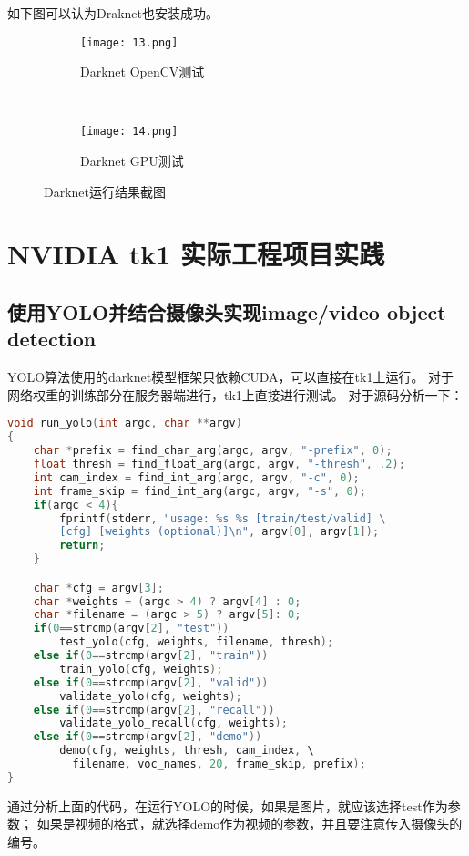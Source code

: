 \documentclass[openany]{ctexbook}
\begin{document}
如下图可以认为Draknet也安装成功。

\begin{figure*}[h]
    \centering
        \begin{subfigure}[h!]{0.5\textwidth}
            \centering
            \texttt{[image: 13.png]}
            \caption{Darknet OpenCV测试}
        \end{subfigure}%
        ~
        \begin{subfigure}[h!]{0.5\textwidth}
            \centering
            \texttt{[image: 14.png]}
            \caption{Darknet GPU测试}
        \end{subfigure}
        \caption{Darknet运行结果截图}
\end{figure*}

\chapter{NVIDIA tk1 实际工程项目实践}
\section{使用YOLO并结合摄像头实现image/video object detection}
YOLO算法使用的darknet模型框架只依赖CUDA，可以直接在tk1上运行。
对于网络权重的训练部分在服务器端进行，tk1上直接进行测试。
对于源码分析一下：
{\setmainfont{Courier New Bold}                          %
\begin{lstlisting}[language=c]
void run_yolo(int argc, char **argv)
{
    char *prefix = find_char_arg(argc, argv, "-prefix", 0);
    float thresh = find_float_arg(argc, argv, "-thresh", .2);
    int cam_index = find_int_arg(argc, argv, "-c", 0);
    int frame_skip = find_int_arg(argc, argv, "-s", 0);
    if(argc < 4){
        fprintf(stderr, "usage: %s %s [train/test/valid] \
        [cfg] [weights (optional)]\n", argv[0], argv[1]);
        return;
    }

    char *cfg = argv[3];
    char *weights = (argc > 4) ? argv[4] : 0;
    char *filename = (argc > 5) ? argv[5]: 0;
    if(0==strcmp(argv[2], "test"))
        test_yolo(cfg, weights, filename, thresh);
    else if(0==strcmp(argv[2], "train"))
        train_yolo(cfg, weights);
    else if(0==strcmp(argv[2], "valid"))
        validate_yolo(cfg, weights);
    else if(0==strcmp(argv[2], "recall"))
        validate_yolo_recall(cfg, weights);
    else if(0==strcmp(argv[2], "demo"))
        demo(cfg, weights, thresh, cam_index, \
          filename, voc_names, 20, frame_skip, prefix);
}
\end{lstlisting}}
通过分析上面的代码，在运行YOLO的时候，如果是图片，就应该选择test作为参数；
如果是视频的格式，就选择demo作为视频的参数，并且要注意传入摄像头的编号。
\end{document}
